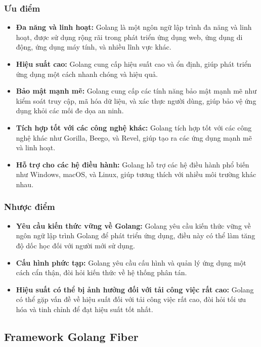\subsubsection{Ưu điểm}
\begin{itemize}
  \item \textbf{Đa năng và linh hoạt:} Golang là một ngôn ngữ lập trình đa năng và linh hoạt, được sử dụng rộng rãi trong phát triển ứng dụng web, ứng dụng di động, ứng dụng máy tính, và nhiều lĩnh vực khác.
  \item \textbf{Hiệu suất cao:} Golang cung cấp hiệu suất cao và ổn định, giúp phát triển ứng dụng một cách nhanh chóng và hiệu quả.
  \item \textbf{Bảo mật mạnh mẽ:} Golang cung cấp các tính năng bảo mật mạnh mẽ như kiểm soát truy cập, mã hóa dữ liệu, và xác thực người dùng, giúp bảo vệ ứng dụng khỏi các mối đe dọa an ninh.
  \item \textbf{Tích hợp tốt với các công nghệ khác:} Golang tích hợp tốt với các công nghệ khác như Gorilla, Beego, và Revel, giúp tạo ra các ứng dụng mạnh mẽ và linh hoạt.
  \item \textbf{Hỗ trợ cho các hệ điều hành:} Golang hỗ trợ các hệ điều hành phổ biến như Windows, macOS, và Linux, giúp tương thích với nhiều môi trường khác nhau.
\end{itemize}
\subsubsection{Nhược điểm}
\begin{itemize}
  \item \textbf{Yêu cầu kiến thức vững về Golang:} Golang yêu cầu kiến thức vững về ngôn ngữ lập trình Golang để phát triển ứng dụng, điều này có thể làm tăng độ dốc học đối với người mới sử dụng.
  \item \textbf{Cấu hình phức tạp:} Golang yêu cầu cấu hình và quản lý ứng dụng một cách cẩn thận, đòi hỏi kiến thức về hệ thống phân tán.
  \item \textbf{Hiệu suất có thể bị ảnh hưởng đối với tải công việc rất cao:} Golang có thể gặp vấn đề về hiệu suất đối với tải công việc rất cao, đòi hỏi tối ưu hóa và tinh chỉnh để đạt hiệu suất tốt nhất.
\end{itemize}
\subsection{Framework Golang Fiber}
